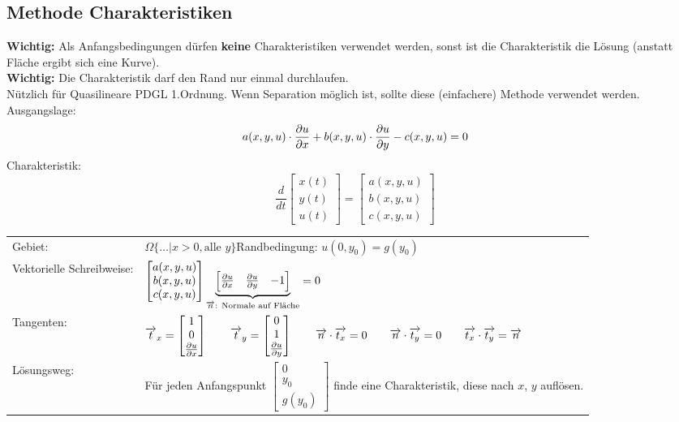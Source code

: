 \subsection{Methode Charakteristiken}

\textbf{Wichtig:} Als Anfangsbedingungen dürfen \textbf{keine} Charakteristiken verwendet werden, sonst ist die Charakteristik die Lösung (anstatt Fläche ergibt sich eine Kurve).\\
\textbf{Wichtig:} Die Charakteristik darf den Rand nur einmal durchlaufen.\\
Nützlich für Quasilineare PDGL 1.Ordnung. Wenn Separation möglich ist, sollte diese (einfachere) Methode verwendet werden.\\

Ausgangslage:
\[
    a(x,y,u)\cdot\frac{\partial u}{\partial x}+b(x,y,u)\cdot\frac{\partial u}{\partial y}-c(x,y,u)=0
\]
Charakteristik:
\[
    \frac{d}{dt} \begin{bmatrix} x(t) \\ y(t) \\ u(t) \end{bmatrix}
    = \begin{bmatrix} a(x,y,u) \\ b(x,y,u) \\ c(x,y,u) \end{bmatrix}
\]


\begin{tabular}{ll}
Gebiet:& $\Omega\{\ldots|x>0, \text{alle }y\}$\qquad Randbedingung: $u(0,y_0)=g(y_0)$\\
Vektorielle Schreibweise:& $\begin{bmatrix}
    a(x,y,u)\\ b(x,y,u)\\ c(x,y,u)
    \end{bmatrix}
\underset{\overrightarrow{n}\text{: Normale auf Fläche}}{\underbrace{\begin{bmatrix}
\frac{\partial u}{\partial x} & \frac{\partial u}{\partial y} & -1
\end{bmatrix}}}=0 $ \\[1cm]
Tangenten:& $\overrightarrow{t}_x=\begin{bmatrix}1\\0\\ \frac{\partial u}{\partial x}\end{bmatrix}\qquad 
			\overrightarrow{t}_y=\begin{bmatrix}0\\1\\ \frac{\partial u}{\partial y}\end{bmatrix}\qquad \overrightarrow{n} \cdot \overrightarrow{t_x} = 0 \qquad \overrightarrow{n} \cdot \overrightarrow{t_y} = 0 \qquad \overrightarrow{t_x} \cdot \overrightarrow{t_y} = \overrightarrow{n}$\\[1cm]

Lösungsweg: & Für jeden Anfangspunkt $\begin{bmatrix} 0\\y_0\\g(y_0)\end{bmatrix}$ finde eine Charakteristik, diese nach $x$, $y$ auflösen.
\end{tabular}


